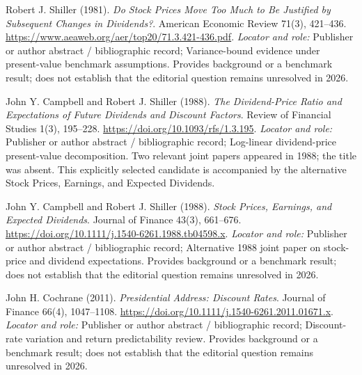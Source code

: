 \documentclass[11pt,a4paper]{article}
\begin{document}
\begin{enumerate}[label={[S\arabic*]},leftmargin=*]

\item Robert J. Shiller (1981). \emph{Do Stock Prices Move Too Much to Be Justified by Subsequent Changes in Dividends?}. American Economic Review 71(3), 421–436. \url{https://www.aeaweb.org/aer/top20/71.3.421-436.pdf}.
\textit{Locator and role:} Publisher or author abstract / bibliographic record; Variance-bound evidence under present-value benchmark assumptions. Provides background or a benchmark result; does not establish that the editorial question remains unresolved in 2026.

\item John Y. Campbell and Robert J. Shiller (1988). \emph{The Dividend-Price Ratio and Expectations of Future Dividends and Discount Factors}. Review of Financial Studies 1(3), 195–228. \url{https://doi.org/10.1093/rfs/1.3.195}.
\textit{Locator and role:} Publisher or author abstract / bibliographic record; Log-linear dividend-price present-value decomposition. Two relevant joint papers appeared in 1988; the title was absent. This explicitly selected candidate is accompanied by the alternative Stock Prices, Earnings, and Expected Dividends.

\item John Y. Campbell and Robert J. Shiller (1988). \emph{Stock Prices, Earnings, and Expected Dividends}. Journal of Finance 43(3), 661–676. \url{https://doi.org/10.1111/j.1540-6261.1988.tb04598.x}.
\textit{Locator and role:} Publisher or author abstract / bibliographic record; Alternative 1988 joint paper on stock-price and dividend expectations. Provides background or a benchmark result; does not establish that the editorial question remains unresolved in 2026.

\item John H. Cochrane (2011). \emph{Presidential Address: Discount Rates}. Journal of Finance 66(4), 1047–1108. \url{https://doi.org/10.1111/j.1540-6261.2011.01671.x}.
\textit{Locator and role:} Publisher or author abstract / bibliographic record; Discount-rate variation and return predictability review. Provides background or a benchmark result; does not establish that the editorial question remains unresolved in 2026.

\end{enumerate}
\end{document}
